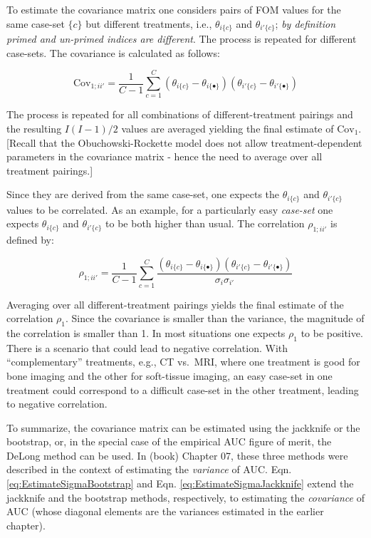\documentclass[
]{book}
\begin{document}
To estimate the covariance matrix one considers pairs of FOM values for the same case-set \(\{c\}\) but different treatments, i.e., \(\theta_{i\{c\}}\) and \(\theta_{i'\{c\}}\); \emph{by definition primed and un-primed indices are different}. The process is repeated for different case-sets. The covariance is calculated as follows:

\begin{equation}
\text{Cov}_{1;ii'} = \frac{1}{C-1}\sum_{c=1}^{C} \left ( \theta_{i\{c\}} - \theta_{i\{\bullet\}} \right) \left ( \theta_{i'\{c\}} - \theta_{i'\{\bullet\}} \right)
\label{eq:EstimateCov}
\end{equation}

The process is repeated for all combinations of different-treatment pairings and the resulting \(I(I-1)/2\) values are averaged yielding the final estimate of \(\text{Cov}_1\). {[}Recall that the Obuchowski-Rockette model does not allow treatment-dependent parameters in the covariance matrix - hence the need to average over all treatment pairings.{]}

Since they are derived from the same case-set, one expects the \(\theta_{i\{c\}}\) and \(\theta_{i'\{c\}}\) values to be correlated. As an example, for a particularly easy \emph{case-set} one expects \(\theta_{i\{c\}}\) and \(\theta_{i'\{c\}}\) to be both higher than usual. The correlation \(\rho_{1;ii'}\) is defined by:

\begin{equation}
\rho_{1;ii'} = \frac{1}{C-1}\sum_{c=1}^{C} \frac {\left ( \theta_{i\{c\}} - \theta_{i\{\bullet\}} \right) \left ( \theta_{i'\{c\}} - \theta_{i'\{\bullet\}} \right)}{\sigma_i \sigma_{i'} }
\label{eq:EstimateRho}
\end{equation}

Averaging over all different-treatment pairings yields the final estimate of the correlation \(\rho_1\). Since the covariance is smaller than the variance, the magnitude of the correlation is smaller than 1. In most situations one expects \(\rho_1\) to be positive. There is a scenario that could lead to negative correlation. With ``complementary'' treatments, e.g., CT vs.~MRI, where one treatment is good for bone imaging and the other for soft-tissue imaging, an easy case-set in one treatment could correspond to a difficult case-set in the other treatment, leading to negative correlation.

To summarize, the covariance matrix can be estimated using the jackknife or the bootstrap, or, in the special case of the empirical AUC figure of merit, the DeLong method can be used. In (book) Chapter 07, these three methods were described in the context of estimating the \emph{variance} of AUC. Eqn. \eqref{eq:EstimateSigmaBootstrap} and Eqn. \eqref{eq:EstimateSigmaJackknife} extend the jackknife and the bootstrap methods, respectively, to estimating the \emph{covariance} of AUC (whose diagonal elements are the variances estimated in the earlier chapter).
\end{document}
